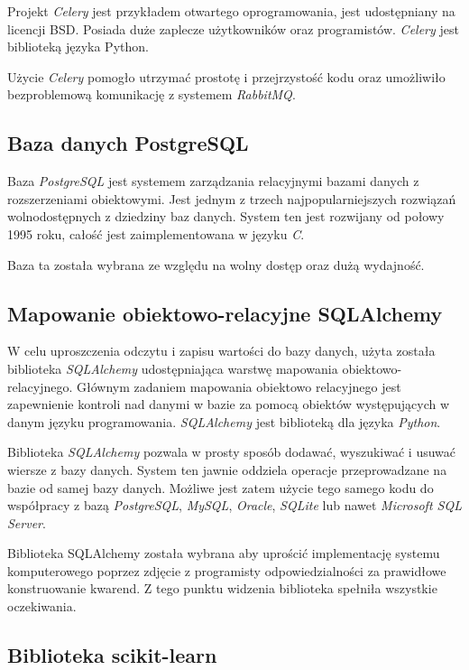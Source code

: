 \documentclass[../thesis.tex]{subfiles}
\begin{document}
Projekt \emph{Celery} jest przykładem otwartego oprogramowania, jest udostępniany na licencji BSD. Posiada duże zaplecze użytkowników oraz programistów. \emph{Celery} jest biblioteką języka Python.

Użycie \emph{Celery} pomogło utrzymać prostotę i przejrzystość kodu oraz umożliwiło bezproblemową komunikację z systemem \emph{RabbitMQ}.

\subsection{Baza danych PostgreSQL}

Baza \emph{PostgreSQL} jest systemem zarządzania relacyjnymi bazami danych z rozszerzeniami obiektowymi. Jest jednym z trzech najpopularniejszych rozwiązań wolnodostępnych z dziedziny baz danych. System ten jest rozwijany od połowy 1995 roku, całość jest zaimplementowana w języku \emph{C}.

Baza ta została wybrana ze względu na wolny dostęp oraz dużą wydajność.

\subsection{Mapowanie obiektowo-relacyjne SQLAlchemy}

W celu uproszczenia odczytu i zapisu wartości do bazy danych, użyta została biblioteka \emph{SQLAlchemy} udostępniająca warstwę mapowania obiektowo-relacyjnego. Głównym zadaniem mapowania obiektowo relacyjnego jest zapewnienie kontroli nad danymi w bazie za pomocą obiektów występujących w danym języku programowania. \emph{SQLAlchemy} jest biblioteką dla języka \emph{Python}.

Biblioteka \emph{SQLAlchemy} pozwala w prosty sposób dodawać, wyszukiwać i usuwać wiersze z bazy danych. System ten jawnie oddziela operacje przeprowadzane na bazie od samej bazy danych. Możliwe jest zatem użycie tego samego kodu do współpracy z bazą \emph{PostgreSQL}, \emph{MySQL}, \emph{Oracle}, \emph{SQLite} lub nawet\emph{ Microsoft SQL Server}.


Biblioteka SQLAlchemy została wybrana aby uprościć implementację systemu komputerowego poprzez zdjęcie z programisty odpowiedzialności za prawidłowe konstruowanie kwarend. Z tego punktu widzenia biblioteka spełniła wszystkie oczekiwania.

\subsection{Biblioteka scikit-learn}
\end{document}
